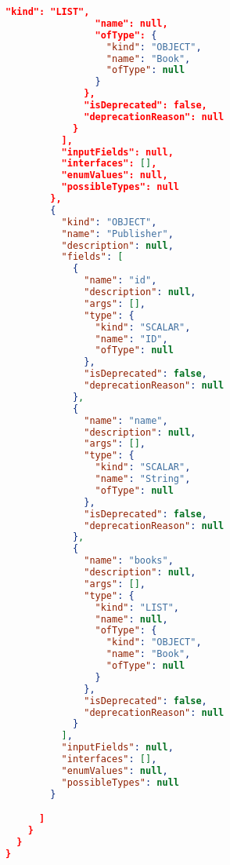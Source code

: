 \begin{lstlisting}[language=json]
                "kind": "LIST",
                "name": null,
                "ofType": {
                  "kind": "OBJECT",
                  "name": "Book",
                  "ofType": null
                }
              },
              "isDeprecated": false,
              "deprecationReason": null
            }
          ],
          "inputFields": null,
          "interfaces": [],
          "enumValues": null,
          "possibleTypes": null
        },
        {
          "kind": "OBJECT",
          "name": "Publisher",
          "description": null,
          "fields": [
            {
              "name": "id",
              "description": null,
              "args": [],
              "type": {
                "kind": "SCALAR",
                "name": "ID",
                "ofType": null
              },
              "isDeprecated": false,
              "deprecationReason": null
            },
            {
              "name": "name",
              "description": null,
              "args": [],
              "type": {
                "kind": "SCALAR",
                "name": "String",
                "ofType": null
              },
              "isDeprecated": false,
              "deprecationReason": null
            },
            {
              "name": "books",
              "description": null,
              "args": [],
              "type": {
                "kind": "LIST",
                "name": null,
                "ofType": {
                  "kind": "OBJECT",
                  "name": "Book",
                  "ofType": null
                }
              },
              "isDeprecated": false,
              "deprecationReason": null
            }
          ],
          "inputFields": null,
          "interfaces": [],
          "enumValues": null,
          "possibleTypes": null
        }

      ]
    }
  }
}
\end{lstlisting}